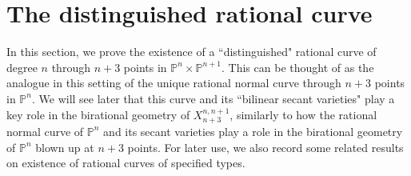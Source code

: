 \documentclass[a4paper,11pt]{article}
\newcommand{\PP}{\mathbb P}
\newcommand{\ourproduct}{\mathbb P^n \times \mathbb P^{n+1}}
\newcommand{\ourproductblowupthree}{X^{n,n+1}_{n+3}}
\begin{document}
\section{The distinguished rational curve}

In this section, we prove the existence of a ``distinguished" rational curve of degree $n$ through $n+3$ points in $\ourproduct$. This can be thought of as the analogue in this setting of the unique rational normal curve through $n+3$ points in $\PP^n$. We will see later that this curve and its ``bilinear secant varieties" play a key role in the birational geometry of $\ourproductblowupthree$, similarly to how the rational normal curve of $\PP^n$ and its secant varieties play a role in the birational geometry of $\PP^n$ blown up at $n+3$ points. For later use, we also record some related results on existence of rational curves of specified types.
\end{document}
